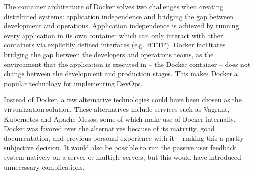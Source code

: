 


The container architecture of Docker solves two challenges when creating distributed systems: application independence and bridging the gap between development and operations.
Application independence is achieved by running every application in its own container which can only interact with other containers via explicitly defined interfaces (e.g. HTTP).
Docker facilitates bridging the gap between the developers and operations teams, as the environment that the application is executed in -- the Docker container -- does not change between the development and production stages.
This makes Docker a popular technology for implementing DevOps.

Instead of Docker, a few alternative technologies could have been chosen as the virtualization solution.
These alternatives include services such as Vagrant, Kubernetes and Apache Mesos, some of which make use of Docker internally.
Docker was favored over the alternatives because of its maturity, good documentation, and previous personal experience with it -- making this a partly subjective decision.
It would also be possible to run the passive user feedback system natively on a server or multiple servers, but this would have introduced unnecessary complications.